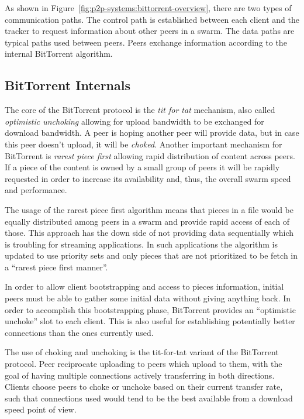 As shown in Figure~\ref{fig:p2p-systems:bittorrent-overview}, there are two
types of communication paths. The control path is established between each
client and the tracker to request information about other peers in a swarm.
The data paths are typical paths used between peers. Peers exchange
information according to the internal BitTorrent algorithm.

\subsection{BitTorrent Internals}

The core of the BitTorrent protocol is the \textit{tit for tat} mechanism,
also called \textit{optimistic unchoking} allowing for upload bandwidth to be
exchanged for download bandwidth. A peer is hoping another peer will provide
data, but in case this peer doesn't upload, it will be \textit{choked}.
Another important mechanism for BitTorrent is \textit{rarest piece first}
allowing rapid distribution of content across peers. If a piece of the content
is owned by a small group of peers it will be rapidly requested in order to
increase its availability and, thus, the overall swarm speed and performance.

The usage of the rarest piece first algorithm means that pieces in a file
would be equally distributed among peers in a swarm and provide rapid access
of each of those. This approach has the down side of not providing data
sequentially which is troubling for streaming applications. In such
applications the algorithm is updated to use priority sets and only pieces
that are not prioritized to be fetch in a ``rarest piece first manner''.

In order to allow client bootstrapping and access to pieces information,
initial peers must be able to gather some initial data without giving anything
back. In order to accomplish this bootstrapping phase, BitTorrent provides an
``optimistic unchoke'' slot to each client. This is also useful for
establishing potentially better connections than the ones currently used.

The use of choking and unchoking is the tit-for-tat variant of the BitTorrent
protocol. Peer reciprocate uploading to peers which upload to them, with the
goal of having multiple connections actively transferring in both directions.
Clients choose peers to choke or unchoke based on their current transfer rate,
such that connections used would tend to be the best available from a download
speed point of view.

